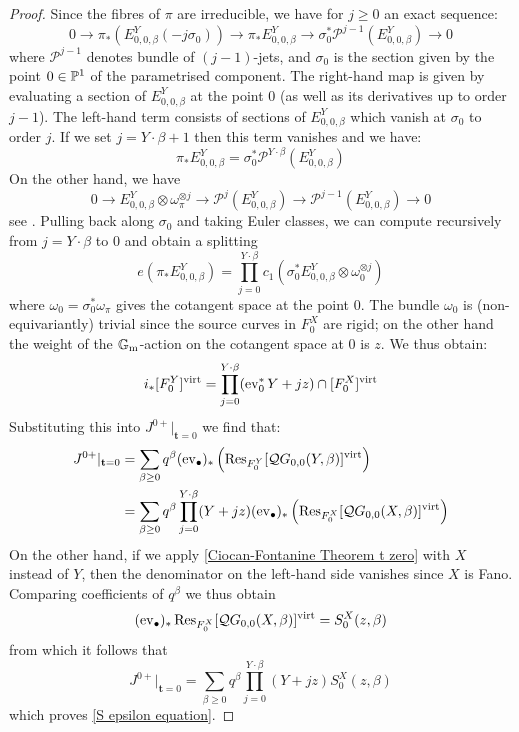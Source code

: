 \begin{proof}
Since the fibres of $\pi$ are irreducible, we have for $j \geq 0$ an exact sequence:
\begin{equation*} 0 \to \pi_* (E^Y_{0,0,\beta}(-j\sigma_0)) \to \pi_* E^Y_{0,0,\beta} \to \sigma_0^*\mathcal{P}^{j-1}(E^Y_{0,0,\beta}) \to 0 \end{equation*}
where $\mathcal{P}^{j-1}$ denotes bundle of $(j-1)$-jets, and $\sigma_{0}$ is the section given by the point $0 \in \mathbb P^1$ of the parametrised component. The right-hand map is given by evaluating a section of $E_{0,0,\beta}^Y$ at the point $0$ (as well as its derivatives up to order $j-1$). The left-hand term consists of sections of $E_{0,0,\beta}^Y$ which vanish at $\sigma_0$ to order $j$. If we set $j=Y\cdot\beta+1$ then this term vanishes and we have:
\begin{equation*} \pi_* E_{0,0,\beta}^Y = \sigma_0^* \mathcal{P}^{Y\cdot\beta}(E_{0,0,\beta}^Y) \end{equation*}
On the other hand, we have
\begin{equation*} 0 \to E^Y_{0,0,\beta} \otimes \omega_\pi^{\otimes j} \to \mathcal{P}^{j}(E^Y_{0,0,\beta}) \to \mathcal{P}^{j-1}(E^Y_{0,0,\beta}) \to 0
\end{equation*}
see \cite[\S 2]{Ga}. Pulling back along $\sigma_0$ and taking Euler classes, we can compute recursively from $j = Y \cdot \beta$ to $0$ and obtain a splitting
\begin{equation*}
e(\pi_* E^Y_{0,0,\beta})=\prod_{j=0}^{Y\cdot\beta} c_1(\sigma_0^* E^Y_{0,0,\beta}\otimes \omega_{0}^{\otimes j})
\end{equation*}
where $\omega_0=\sigma_0^*\omega_\pi$ gives the cotangent space at the point $0$. The bundle $\omega_0$ is (non-equivariantly) trivial since the source curves in $F_0^X$ are rigid; on the other hand the weight of the $\mathbb{G}_{\text{m}}$-action on the cotangent space at $0$ is $z$. We thus obtain:
\begin{equation*} i_*[F_0^Y]^{\operatorname{virt}}=\prod_{j=0}^{Y\cdot\beta}(\operatorname{ev}_0^* Y+jz)\cap [F_0^X]^{\operatorname{virt}} \end{equation*}
Substituting this into $J^{0+}|_{\mathbf{t}=0}$ we find that:
\begin{align*} {J^{0+}}|_{{\mathbf{t}=0}} & = \sum_{\beta\geq 0}q^\beta(\operatorname{ev}_\bullet)_* \left( \operatorname{Res}_{F_0^Y}[\mathcal{Q}G_{0,0}(Y,\beta)]^{\operatorname{virt}} \right) \\
& = \sum_{\beta \geq 0} q^\beta \prod_{j=0}^{Y \cdot \beta} (Y + jz) (\operatorname{ev}_{\bullet})_* \left( \operatorname{Res}_{F_0^X}[\mathcal{Q}G_{0,0}(X,\beta)]^{\operatorname{virt}} \right) \end{align*}
On the other hand, if we apply \eqref{Ciocan-Fontanine Theorem t zero} with $X$ instead of $Y$, then the denominator on the left-hand side vanishes since $X$ is Fano. Comparing coefficients of $q^\beta$ we thus obtain
\begin{equation*} (\operatorname{ev}_{\bullet})_* \operatorname{Res}_{F_0^X}[\mathcal{Q}G_{0,0}(X,\beta)]^{\operatorname{virt}} = S_0^X(z,\beta) \end{equation*}
from which it follows that
\begin{equation*} J^{0+}|_{\mathbf{t}=0} = \sum_{\beta \geq 0} q^\beta \prod_{j=0}^{Y\cdot\beta}(Y+jz) S_0^X(z,\beta)\end{equation*}
which proves \eqref{S epsilon equation}.


\end{proof}
